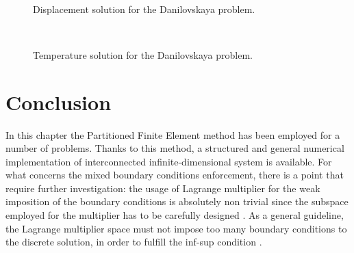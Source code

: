 \begin{figure}[p]%
	\centering
	\hspace{8pt}%
	 \\
	\caption[]{Displacement solution for the Danilovskaya problem.}%
	\label{fig:u_therElas}%
\end{figure}

\begin{figure}[p]%
	\centering
	\hspace{8pt}%
	 \\
	\caption[]{Temperature solution for the Danilovskaya problem.}%
	\label{fig:theta_therElas}%
\end{figure}


\section{Conclusion}
In this chapter the Partitioned Finite Element method has been employed for a number of problems.
Thanks to this method, a structured and general numerical implementation of interconnected infinite-dimensional system is available. For what concerns the mixed boundary conditions enforcement, there is a point that require further investigation: the usage of Lagrange multiplier for the weak imposition of the boundary conditions is absolutely non trivial since the subspace employed for the multiplier has to be carefully designed \cite{pitkaranta1979boundary,pitkaranta1980local,pitkaranta1981finite,gunzburger1992}. As a general guideline, the Lagrange multiplier space must not impose too many boundary conditions to the discrete solution, in order to fulfill the inf-sup condition \cite{joly2003variational}. 












